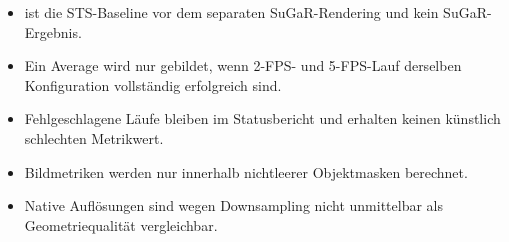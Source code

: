 \begin{itemize}
  \item {} ist die STS-Baseline vor dem separaten
	  SuGaR-Rendering und kein SuGaR-Ergebnis.
  \item Ein Average wird nur gebildet, wenn 2-FPS- und 5-FPS-Lauf derselben
	  Konfiguration vollständig erfolgreich sind.
  \item Fehlgeschlagene Läufe bleiben im Statusbericht und erhalten keinen
	  künstlich schlechten Metrikwert.
  \item Bildmetriken werden nur innerhalb nichtleerer Objektmasken berechnet.
  \item Native Auflösungen sind wegen Downsampling nicht unmittelbar als
	  Geometriequalität vergleichbar.
\end{itemize}
